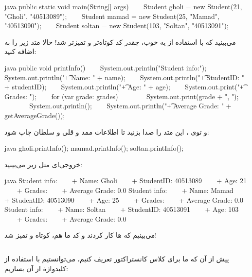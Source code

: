 \begin{codebox}{java}
public static void main(String[] args) {  
    Student gholi = new Student(21, "Gholi", "40513089");  
    Student mamad = new Student(25, "Mamad", "40513090");  
    Student soltan = new Student(103, "Soltan", "40513091");  
}
\end{codebox}

می‌بینید که با استفاده از یه  خوب، چقدر کد
 کوتاه‌تر و تمیزتر شد! حالا متد زیر را به
 اضافه کنید:

\begin{codebox}{java}
public void printInfo() {  
    System.out.println("Student info:");  
    System.out.println("\t+ Name: " + name);  
    System.out.println("\t+ StudentID: " + studentID);  
    System.out.println("\t+ Age: " + age);  
    System.out.print("\t+ Grades: ");
    for (var grade: grades) {  
        System.out.print(grade + ", ");  
    }  
    System.out.println();  
    System.out.println("\t+ Average Grade: " + getAverageGrade());  
}
\end{codebox}

و توی  ، این متد را صدا بزنید تا اطلاعات ممد و قلی و
سلطان چاپ شود:

\begin{codebox}{java}
gholi.printInfo();  
mamad.printInfo();  
soltan.printInfo();
\end{codebox}

خروجی‌ای مثل زیر می‌بینید:

\begin{codebox}{java}
Student info:  
    + Name: Gholi  
    + StudentID: 40513089  
    + Age: 21  
    + Grades:   
    + Average Grade: 0.0  
Student info:  
    + Name: Mamad  
    + StudentID: 40513090  
    + Age: 25  
    + Grades:   
    + Average Grade: 0.0  
Student info:  
    + Name: Soltan  
    + StudentID: 40513091  
    + Age: 103  
    + Grades:   
    + Average Grade: 0.0
\end{codebox}

می‌بینیم که  ها کار کردند و کد ما هم، کوتاه و تمیز شد!

\subsection{}

پیش از آن که ما برای کلاس  کانستراکتور تعریف کنیم،
می‌توانستیم با استفاده از کلیدواژهٔ  از آن 
بسازیم:

